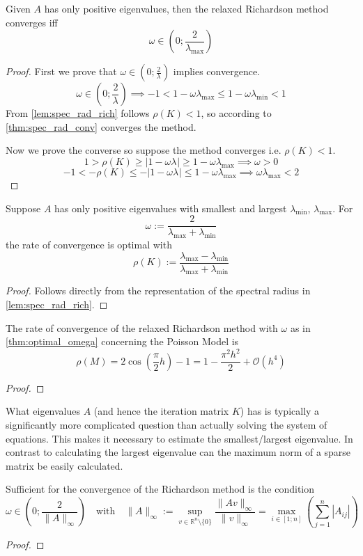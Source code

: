 \begin{theorem}
   Given \(A\) has only positive eigenvalues, then the relaxed Richardson method converges iff
   \[\omega \in \left(0; \frac{2}{\lambda_{\max}}\right)\]
\end{theorem}
\begin{proof}
   First we prove that \(\omega \in \left(0; \frac{2}{\lambda_{}}\right)\) implies convergence.
   \[\omega \in \left(0; \frac{2}{\lambda_{}}\right) \implies -1 < 1 - \omega\lambda_{\max} \leq 1 - \omega\lambda_{\min} < 1\]
   From \cref{lem:spec_rad_rich} follows \(\rho(K) < 1\), so according to \cref{thm:spec_rad_conv} converges the method.

   Now we prove the converse so suppose the method converges i.e. \(\rho(K) < 1\).
   \[1 > \rho(K) \geq |1 - \omega\lambda_{}| \geq 1 - \omega\lambda_{\max} \implies \omega > 0\]
   \[-1 < - \rho(K) \leq - |1 - \omega\lambda_{}| \leq 1 - \omega\lambda_{\max} \implies \omega\lambda_{\max} < 2\]
\end{proof}

\begin{theorem}\label{thm:optimal_omega}
   Suppose \(A\) has only positive eigenvalues with smallest and largest \(\lambda_{\min}\), \(\lambda_{\max}\).
   For
   \[\omega := \frac{2}{\lambda_{\max} + \lambda_{\min}}\]
   the rate of convergence is optimal with
   \[\rho(K) := \frac{\lambda_{\max} - \lambda_{\min}}{\lambda_{\max} + \lambda_{\min}}\]
\end{theorem}
\begin{proof}
   Follows directly from the representation of the spectral radius in \cref{lem:spec_rad_rich}.
\end{proof}

\begin{corollary}
   The rate of convergence of the relaxed Richardson method with \(\omega\) as in \cref{thm:optimal_omega} concerning the Poisson Model is
   \[\rho(M) = 2 \cos\left(\frac{\pi}{2}h\right) - 1 = 1 - \frac{\pi^2 h^2}{2} + \mathcal{O}(h^4)\]
\end{corollary}
\begin{proof}
\end{proof}

What eigenvalues \(A\) (and hence the iteration matrix \(K\)) has is typically a significantly more complicated question than actually solving the system of equations.
This makes it necessary to estimate the smallest/largest eigenvalue.
In contrast to calculating the largest eigenvalue can the maximum norm of a sparse matrix be easily calculated.
\begin{corollary}
   Sufficient for the convergence of the Richardson method is the condition
   \[\omega \in \left(0; \frac{2}{\|A\|_\infty}\right) \quad\text{with}\quad \|A\|_\infty := \sup_{v \in \mathbb{R}^n \setminus \{0\}} \frac{\|Av\|_\infty}{\|v\|_\infty} = \max_{i \in [1;n]}\left(\sum_{j = 1}^n |A_{ij}|\right)\]
\end{corollary}
\begin{proof}
\end{proof}

